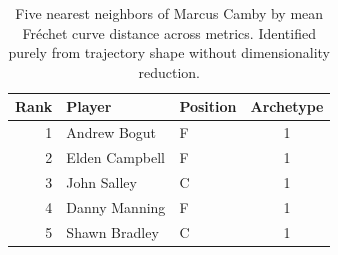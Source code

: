 \begin{table}[htbp]
  \centering\small
  \begin{tabular}{rllc}
    \toprule
    Rank & Player & Position & Archetype \\
    \midrule
    1 & Andrew Bogut & F & 1 \\
    2 & Elden Campbell & F & 1 \\
    3 & John Salley & C & 1 \\
    4 & Danny Manning & F & 1 \\
    5 & Shawn Bradley & C & 1 \\
    \bottomrule
  \end{tabular}
  \caption{Five nearest neighbors of Marcus Camby by mean Fr\'{e}chet curve distance across metrics. Identified purely from trajectory shape without dimensionality reduction.}
  \label{tab:Marcus_Camby_frechet_curve_neighbors}
\end{table}


